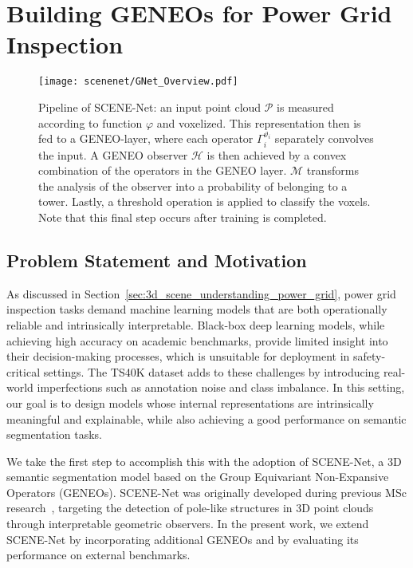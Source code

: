 \section{Building GENEOs for Power Grid Inspection}\label{sec:scenenetv1}

\begin{figure}[ht]\label{fig:gnet_overview}
      \centering
      \texttt{[image: scenenet/GNet\_Overview.pdf]}
      \caption[SCENE-Net Architecture]{Pipeline of SCENE-Net: an input point cloud  $\mathcal{P}$ is measured according to function $\varphi$ and voxelized. This representation then is fed to a GENEO-layer, where each operator $\Gamma_i^{\vartheta_i}$ separately convolves the input.
            A GENEO observer $\mathcal{H}$ is then achieved by a convex combination of the operators in the GENEO layer.
            $\mathcal{M}$ transforms the analysis of the observer into a probability of belonging to a tower. %
            Lastly, a threshold operation is applied to classify the voxels. Note that this final step occurs after training is completed.
      }
\end{figure}
\subsection{Problem Statement and Motivation}
As discussed in Section~\ref{sec:3d_scene_understanding_power_grid}, power grid
inspection tasks demand machine learning models that are both operationally
reliable and intrinsically interpretable. Black-box deep learning models, while
achieving high accuracy on academic benchmarks, provide limited insight into
their decision-making processes, which is unsuitable for deployment in
safety-critical settings.
%
The TS40K dataset adds to these challenges by introducing real-world
imperfections such as annotation noise and class imbalance. In this setting,
our goal is to design models whose internal representations are intrinsically
meaningful and explainable, while also achieving a good performance on semantic
segmentation tasks.

We take the first step to accomplish this with the adoption of SCENE-Net, a 3D
semantic segmentation model based on the Group Equivariant Non-Expansive
Operators (GENEOs).
%
SCENE-Net was originally developed during previous MSc
research~\cite{lavado2022detection}, targeting the detection of pole-like
structures in 3D point clouds through interpretable geometric observers. In the
present work, we extend SCENE-Net by incorporating additional GENEOs and by
evaluating its performance on external benchmarks.

